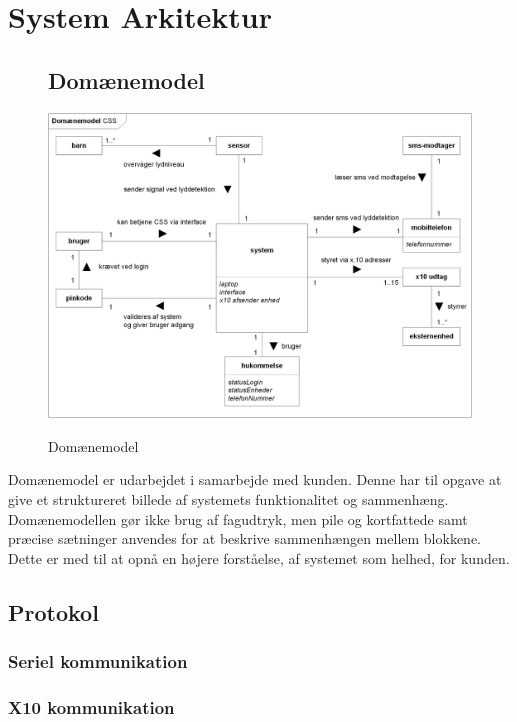 %
%
\chapter{System Arkitektur}

\begin{figure}[htbp] \centering
\section{Domænemodel}
{\includegraphics[width=\textwidth]{billeder/diagrammer/Domain_Model}}
\caption{Domænemodel}
\label{lab:domainmodel}
\end{figure}
Domænemodel er udarbejdet i samarbejde med kunden. Denne har til opgave at give et struktureret billede af systemets funktionalitet og sammenhæng. Domænemodellen gør ikke brug af fagudtryk, men pile og kortfattede samt præcise sætninger anvendes for at beskrive sammenhængen mellem blokkene. Dette er med til at opnå en højere forståelse, af systemet som helhed, for kunden.

\section{Protokol}

\subsection{Seriel kommunikation}


\newpage
\subsection{X10 kommunikation}


